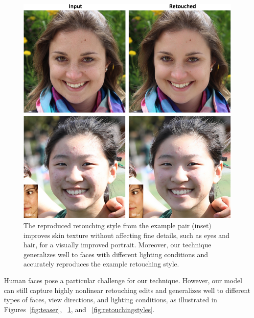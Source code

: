 \begin{figure}[th] %
    \centering
	\includegraphics[width=0.8\columnwidth]{Chapters/detail-retouching-figs/res_diff_light_2_cvmp.pdf}
    \caption{\label{fig:newdataset_ex}The reproduced retouching style from the example pair (inset) improves skin texture without affecting fine details, such as eyes and hair, for a visually improved portrait. Moreover, our technique generalizes well to faces with different lighting conditions and accurately reproduces the example retouching style.}
 
\end{figure}
Human faces pose a particular challenge for our technique. However, our model can still capture highly nonlinear retouching edits and generalizes well to different types of faces, view directions, and lighting conditions, as illustrated in Figures~\ref{fig:teaser}, ~\ref{fig:newdataset_ex}, and ~\ref{fig:retouchingstyles}.

